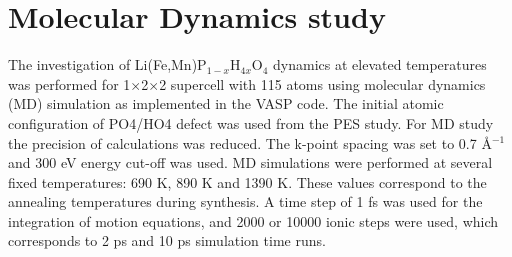 \section{Molecular Dynamics study}

The investigation of Li(Fe,Mn)P$_{1-x}$H$_{4x}$O$_4$ dynamics at elevated temperatures was performed for 1$\times$2$\times$2 supercell with 115 atoms using molecular dynamics (MD) simulation as implemented in the VASP code. The initial atomic configuration of PO4/HO4 defect was used from the PES study.
For MD study the precision of calculations was reduced. The k-point spacing was set to 0.7 {\AA}$^{-1}$ and 300 eV energy cut-off was used. 
MD simulations were performed at several fixed temperatures: 690 K, 890 K and 1390 K. These values correspond to the annealing temperatures during synthesis. A time step of 1 fs  was used for the integration of motion equations, and 2000 or 10000 ionic steps were used, which corresponds to 2 ps and 10 ps simulation time runs. 
